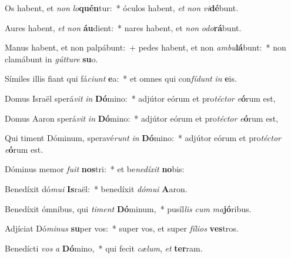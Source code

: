 \item Os habent, et \textit{non} \textit{lo}\textbf{quén}tur:~* óculos habent, \textit{et} \textit{non} \textit{vi}\textbf{dé}bunt.

\item Aures habent, \textit{et} \textit{non} \textbf{áu}dient:~* nares habent, et \textit{non} \textit{o}\textit{do}\textbf{rá}bunt.

\item Manus habent, et non palpábunt:~+ pedes habent, et non \textit{am}\textit{bu}\textbf{lá}bunt:~* non clamábunt in \textit{gút}\textit{tu}\textit{re} \textbf{su}o.

\item Símiles illis fiant qui fá\textit{ci}\textit{unt} \textbf{e}a:~* et omnes qui con\textit{fí}\textit{dunt} \textit{in} \textbf{e}is.

\item Domus Israël sperá\textit{vit} \textit{in} \textbf{Dó}mino:~* adjútor eórum et pro\textit{téc}\textit{tor} \textit{e}\textbf{ó}rum est,

\item Domus Aaron sperá\textit{vit} \textit{in} \textbf{Dó}mino:~* adjútor eórum et pro\textit{téc}\textit{tor} \textit{e}\textbf{ó}rum est,

\item Qui timent Dóminum, speravé\textit{runt} \textit{in} \textbf{Dó}mino:~* adjútor eórum et pro\textit{téc}\textit{tor} \textit{e}\textbf{ó}rum est.

\item Dóminus memor \textit{fu}\textit{it} \textbf{nos}tri:~* et be\textit{ne}\textit{dí}\textit{xit} \textbf{no}bis:

\item Benedíxit dó\textit{mu}\textit{i} \textbf{Is}raël:~* benedíxit \textit{dó}\textit{mu}\textit{i} \textbf{A}aron.

\item Benedíxit ómnibus, qui \textit{ti}\textit{ment} \textbf{Dó}minum,~* pusíl\textit{lis} \textit{cum} \textit{ma}\textbf{jó}ribus.

\item Adjíciat Dó\textit{mi}\textit{nus} \textbf{su}per vos:~* super vos, et super \textit{fí}\textit{li}\textit{os} \textbf{ves}tros.

\item Benedícti \textit{vos} \textit{a} \textbf{Dó}mino,~* qui fecit \textit{cæ}\textit{lum}, \textit{et} \textbf{ter}ram.

